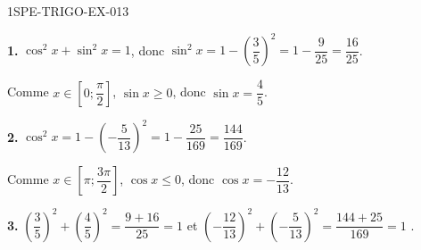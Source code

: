\begin{corrige}{1SPE-TRIGO-EX-013}

\textbf{1.} $\cos^2 x + \sin^2 x = 1$, donc $\sin^2 x = 1 - \left(\dfrac{3}{5}\right)^2 = 1 - \dfrac{9}{25} = \dfrac{16}{25}$.

Comme $x \in \left[0;\dfrac{\pi}{2}\right]$, $\sin x \geqslant 0$, donc $\sin x = \dfrac{4}{5}$.

\textbf{2.} $\cos^2 x = 1 - \left(-\dfrac{5}{13}\right)^2 = 1 - \dfrac{25}{169} = \dfrac{144}{169}$.

Comme $x \in \left[\pi;\dfrac{3\pi}{2}\right]$, $\cos x \leqslant 0$, donc $\cos x = -\dfrac{12}{13}$.

\textbf{3.} $\left(\dfrac{3}{5}\right)^2 + \left(\dfrac{4}{5}\right)^2 = \dfrac{9+16}{25} = 1$ \checkmark \quad et \quad $\left(-\dfrac{12}{13}\right)^2 + \left(-\dfrac{5}{13}\right)^2 = \dfrac{144+25}{169} = 1$ \checkmark.

\end{corrige}
